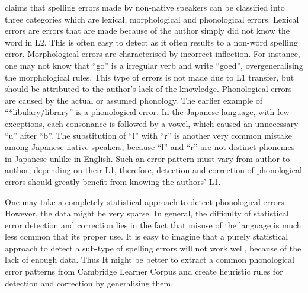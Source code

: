 \documentclass[11pt]{article}
\begin{document}
\cite{rimrott2008evaluating} claims that spelling errors made by non-native speakers can be classified into three categories which are lexical, morphological and phonological errors. Lexical errors are errors that are made because of the author simply did not know the word in L2. This is often easy to detect as it often results to a non-word spelling error. Morphological errors are characterised by incorrect inflection. For instance, one may not know that ``go'' is a irregular verb and write ``goed'', overgeneralising the morphological rules. This type of errors is not made due to L1 transfer, but should be attributed to the author's lack of the knowledge. Phonological errors are caused by the actual or assumed phonology. The earlier example of ``*libulary/library'' is a phonological error. In the Japanese language, with few exceptions, each consonance is followed by a vowel, which caused an unnecessary ``u'' after ``b''.  The substitution of ``l'' with ``r'' is another very common mistake among Japanese native speakers, because ``l'' and ``r'' are not distinct phonemes in Japanese unlike in English. Such an error pattern must vary from author to author, depending on their L1, therefore, detection and correction of phonological errors should greatly benefit from knowing the authors' L1.

One may take a completely statistical approach to detect phonological errors. However, the data might be very sparse. In general, the difficulty of statistical error detection and correction lies in the fact that misuse of the language is much less common that its proper use. It is easy to imagine that a purely statistical approach to detect a sub-type of spelling errors will not work well, because of the lack of enough data. Thus It might be better to extract a common phonological error patterns from Cambridge Learner Corpus and create heuristic rules for detection and correction by generalising them.
\end{document}
